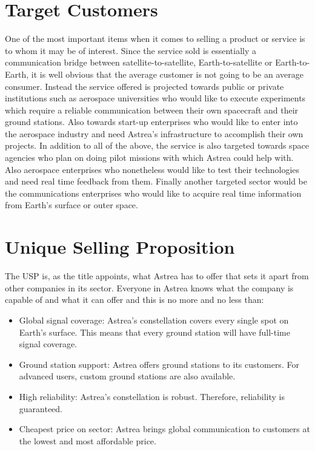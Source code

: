 \section{Target Customers}
One of the most important items when it comes to selling a product or service is to whom it may be of interest. Since the service sold is essentially a communication bridge between satellite-to-satellite, Earth-to-satellite or Earth-to-Earth, it is well obvious that the average customer is not going to be an average consumer.
\newline\newline
Instead the service offered is projected towards public or private institutions such as aerospace universities who would like to execute experiments which require a reliable communication between their own spacecraft and their ground stations. Also towards start-up enterprises who would like to enter into the aerospace industry and need Astrea's infrastructure to accomplish their own projects.
\newline\newline
In addition to all of the above, the service is also targeted towards space agencies who plan on doing pilot missions with which Astrea could help with. Also aerospace enterprises who nonetheless would like to test their technologies and need real time feedback from them. Finally another targeted sector would be the communications enterprises who would like to acquire real time information from Earth's surface or outer space.
\section{Unique Selling Proposition}
The USP is, as the title appoints, what Astrea has to offer that sets it apart from other companies in its sector. Everyone in Astrea knows what the company is capable of and what it can offer and this is no more and no less than:
\begin{itemize}
\item Global signal coverage: Astrea's constellation covers every single spot on Earth's surface. This means that every ground station will have full-time signal coverage.
\item Ground station support: Astrea offers ground stations to its customers. For advanced users, custom ground stations are also available.
\item High reliability: Astrea's constellation is robust. Therefore, reliability is guaranteed.
\item Cheapest price on sector: Astrea brings global communication to customers at the lowest and most affordable price.
\end{itemize}
